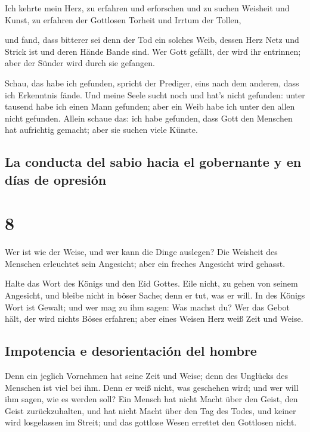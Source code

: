  Ich kehrte mein Herz, zu erfahren und erforschen und zu
suchen Weisheit und Kunst, zu erfahren der Gottlosen Torheit und Irrtum
der Tollen,

 und fand, dass bitterer sei denn der Tod ein solches
Weib, dessen Herz Netz und Strick ist und deren Hände Bande sind. Wer
Gott gefällt, der wird ihr entrinnen; aber der Sünder wird durch sie
gefangen.

 Schau, das habe ich gefunden, spricht der Prediger, eins
nach dem anderen, dass ich Erkenntnis fände.  Und meine
Seele sucht noch und hat's nicht gefunden: unter tausend habe ich einen
Mann gefunden; aber ein Weib habe ich unter den allen nicht gefunden.
 Allein schaue das: ich habe gefunden, dass Gott den
Menschen hat aufrichtig gemacht; aber sie suchen viele Künste.

\hypertarget{la-conducta-del-sabio-hacia-el-gobernante-y-en-duxedas-de-opresiuxf3n}{%
\subsection{La conducta del sabio hacia el gobernante y en días de
opresión}\label{la-conducta-del-sabio-hacia-el-gobernante-y-en-duxedas-de-opresiuxf3n}}

\hypertarget{section-7}{%
\section{8}\label{section-7}}

 Wer ist wie der Weise, und wer kann die Dinge auslegen?
Die Weisheit des Menschen erleuchtet sein Angesicht; aber ein freches
Angesicht wird gehasst.

 Halte das Wort des Königs und den Eid Gottes.
 Eile nicht, zu gehen von seinem Angesicht, und bleibe
nicht in böser Sache; denn er tut, was er will.  In des
Königs Wort ist Gewalt; und wer mag zu ihm sagen: Was machst du?
 Wer das Gebot hält, der wird nichts Böses erfahren; aber
eines Weisen Herz weiß Zeit und Weise.

\hypertarget{impotencia-e-desorientaciuxf3n-del-hombre}{%
\subsection{Impotencia e desorientación del
hombre}\label{impotencia-e-desorientaciuxf3n-del-hombre}}

 Denn ein jeglich Vornehmen hat seine Zeit und Weise; denn
des Unglücks des Menschen ist viel bei ihm.  Denn er weiß
nicht, was geschehen wird; und wer will ihm sagen, wie es werden soll?
 Ein Mensch hat nicht Macht über den Geist, den Geist
zurückzuhalten, und hat nicht Macht über den Tag des Todes, und keiner
wird losgelassen im Streit; und das gottlose Wesen errettet den
Gottlosen nicht.

